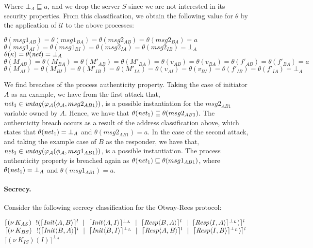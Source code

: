 \documentclass[10pt,a4paper,final,oneside,fleqn]{book}
\begin{document}
\noindent
Where $\bot_A\sqsubseteq a$, and we drop the server $S$ since we are not interested in its security properties.  From this classification, we obtain the following value for $\theta$ by the application of $\mathcal{U}$ to the above processes:\vspace{6mm}

\noindent $\theta(msg1_{AB})=\theta(msg1_{BA})=\theta(msg2_{AB})=\theta(msg2_{BA})=a$\\
$\theta(msg1_{AI})=\theta(msg1_{BI})=\theta(msg2_{IA})=\theta(msg2_{IB})=\bot_A$\\
$\theta(\kappa)=\theta(\mbox{{\itshape net}})=\bot_A$\\
$\theta(M_{AB})=\theta(M_{BA})=\theta(M'_{AB})=\theta(M'_{BA})=\theta(v_{AB})=\theta(v_{BA})=\theta(f'_{AB})=\theta(f'_{BA})=a$\\
$\theta(M_{AI})=\theta(M_{BI})=\theta(M'_{IB})=\theta(M'_{IA})=\theta(v_{AI})=\theta(v_{BI})=\theta(f'_{IB})=\theta(f'_{IA})=\bot_A$\vspace{6mm}

\noindent
We find breaches of the process authenticity property.  Taking the case of initiator $A$ as an example, we have from the first attack that, $\mbox{{\itshape net\/}}_1\in\mbox{{\itshape untag\/}}(\varphi_\mathcal{A}(\phi_\mathcal{A},msg2_{AB1}))$, is a possible instantiation for the $msg2_{AB1}$ variable owned by $A$.  Hence, we have that $\theta(\mbox{{\itshape net\/}}_1)\sqsubseteq\theta(msg2_{AB1})$.  The authenticity breach occurs as a result of the address classification above, which states that $\theta(\mbox{{\itshape net\/}}_1)=\bot_A$ and $\theta(msg2_{AB1})=a$.  In the case of the second attack, and taking the example case of $B$ as the responder, we have that, $\mbox{{\itshape net\/}}_1\in\mbox{{\itshape untag\/}}(\varphi_\mathcal{A}(\phi_\mathcal{A},msg1_{AB1}))$, is a possible instantiation.  The process authenticity property is breached again as $\theta(\mbox{{\itshape net\/}}_1)\sqsubseteq\theta(msg1_{AB1})$, where $\theta(\mbox{{\itshape net\/}}_1)=\bot_A$ and $\theta(msg1_{AB1})=a$.

\paragraph{Secrecy.} Consider the following secrecy classification for the Otway-Rees protocol:\vspace{6mm}

\noindent
$\lceil (\nu~\!K_{AS})~~!(\lceil \mbox{{\itshape Init\/}}\langle A,B\rangle\rceil^l~\mid~\lceil \mbox{{\itshape Init\/}}\langle A,I\rangle\rceil^{\bot_L}~\mid~\lceil \mbox{{\itshape Resp\/}}\langle B,A\rangle\rceil^{l}~\mid~\lceil \mbox{{\itshape Resp\/}}\langle I,A\rangle\rceil^{\bot_L})\rceil^l$\\
$\lceil (\nu~\!K_{BS})~~!(\lceil \mbox{{\itshape Init\/}}\langle B,A\rangle\rceil^l~\mid~\lceil \mbox{{\itshape Init\/}}\langle B,I\rangle\rceil^{\bot_L}~\mid~\lceil \mbox{{\itshape Resp\/}}\langle A,B\rangle\rceil^l~\mid~\lceil \mbox{{\itshape Resp\/}}\langle I,B\rangle\rceil^{\bot_L})\rceil^l$\\
$\lceil (\nu~\!K_{IS})(I)\rceil^{\bot_A}$\vspace{6mm}
\end{document}
